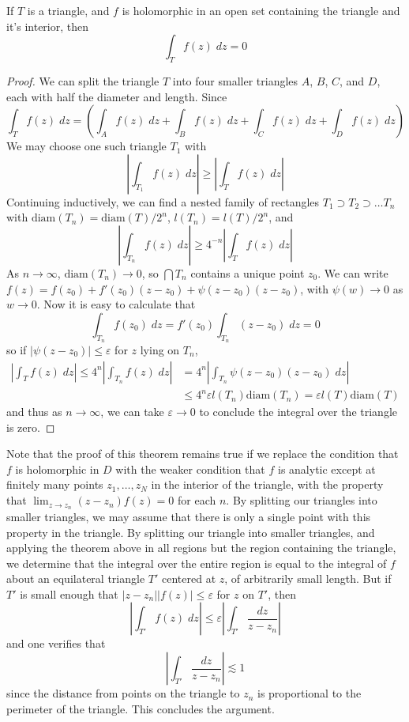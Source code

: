 \begin{theorem}
    If $T$ is a triangle, and $f$ is holomorphic in an open set containing the triangle and it's interior, then
    \[ \int_T f(z)\; dz = 0 \]
\end{theorem}
\begin{proof}
    We can split the triangle $T$ into four smaller triangles $A$, $B$, $C$, and $D$, each with half the diameter and length. Since
    \[ \int_T f(z)\; dz = \left( \int_{A} f(z)\; dz + \int_B f(z)\; dz + \int_C f(z)\; dz + \int_D f(z)\; dz \right) \]
    We may choose one such triangle $T_1$ with
    \[ \left| \int_{T_1} f(z)\; dz \right| \geq \left| \int_T f(z)\; dz \right| \]
    Continuing inductively, we can find a nested family of rectangles $T_1 \supset T_2 \supset \dots T_n$ with $\text{diam}(T_n) = \text{diam}(T)/2^n$, $l(T_n) = l(T)/2^n$, and
    \[ \left| \int_{T_n} f(z)\; dz \right| \geq 4^{-n} \left| \int_T f(z)\; dz \right| \]
    As $n \to \infty$, $\text{diam}(T_n) \to 0$, so $\bigcap T_n$ contains a unique point $z_0$. We can write $f(z) = f(z_0) + f'(z_0) (z - z_0) + \psi(z - z_0)(z - z_0)$, with $\psi(w) \to 0$ as $w \to 0$. Now it is easy to calculate that
    \[ \int_{T_n} f(z_0)\; dz = f'(z_0) \int_{T_n} (z - z_0)\; dz = 0 \]
    so if $|\psi(z - z_0)| \leq \varepsilon$ for $z$ lying on $T_n$,
    \begin{align*}
        \left| \int_T f(z)\; dz \right| \leq 4^n \left| \int_{T_n} f(z)\; dz \right| &= 4^n \left| \int_{T_n} \psi(z-z_0)(z - z_0)\; dz \right|\\
        &\leq 4^n \varepsilon l(T_n) \text{diam}(T_n) = \varepsilon l(T) \text{diam}(T)
    \end{align*}
    and thus as $n \to \infty$, we can take $\varepsilon \to 0$ to conclude the integral over the triangle is zero.
\end{proof}

\begin{remark}
    Note that the proof of this theorem remains true if we replace the condition that $f$ is holomorphic in $D$ with the weaker condition that $f$ is analytic except at finitely many points $z_1, \dots, z_N$ in the interior of the triangle, with the property that $\lim_{z \to z_n} (z - z_n) f(z) = 0$ for each $n$. By splitting our triangles into smaller triangles, we may assume that there is only a single point with this property in the triangle. By splitting our triangle into smaller triangles, and applying the theorem above in all regions but the region containing the triangle, we determine that the integral over the entire region is equal to the integral of $f$ about an equilateral triangle $T'$ centered at $z$, of arbitrarily small length. But if $T'$ is small enough that $|z - z_n| |f(z)| \leq \varepsilon$ for $z$ on $T'$, then
    \[ \left| \int_{T'} f(z)\; dz \right| \leq \varepsilon \left| \int_{T'} \frac{dz}{z - z_n} \right| \]
    and one verifies that
    \[ \left| \int_{T'} \frac{dz}{z - z_n} \right| \lesssim 1 \]
    since the distance from points on the triangle to $z_n$ is proportional to the perimeter of the triangle. This concludes the argument.
\end{remark}

